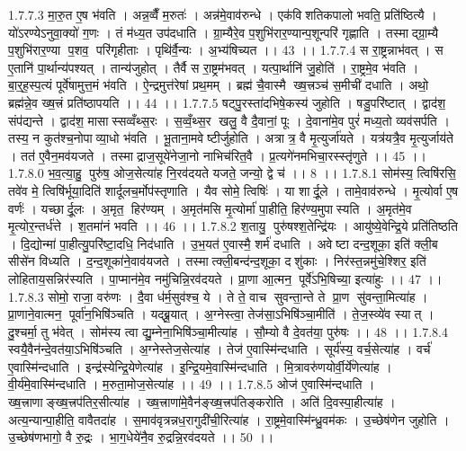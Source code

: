 1.7.7.3
मा॒रु॒त ए॒ष भ॑वति । अन्न॒व्वैँ म॒रुतः॑ । अन्न॑मे॒वाव॑रुन्धे । एक॑विशतिकपालो भवति॒ प्रति॑ष्ठित्यै । यो॑ऽरण्येऽनुवा॒क्यो॑ ग॒णः । तं म॑ध्य॒त उप॑दधाति । ग्रा॒म्यैरे॒व प॒शुभि॑रार॒ण्यान्प॒शून्परि॑ गृह्णाति । तस्माद्ग्रा॒म्यै प॒शुभि॑रार॒ण्या प॒शव॒ परि॑गृहीताः । पृथि॑र्वै॒न्यः । अ॒भ्य॑षिच्यत ।। 43 ।।
1.7.7.4
स रा॒ष्ट्रन्नाभ॑वत् । स ए॒तानि॑ पा॒र्थान्य॑पश्यत् । तान्य॑जुहोत् । तैर्वै स रा॒ष्ट्रम॑भवत् । यत्पा॒र्थानि॑ जु॒होति॑ । रा॒ष्ट्रमे॒व भ॑वति । बा॒र्॒ह॒स्प॒त्यं पूर्वे॑षामुत्त॒मं भ॑वति । ऐ॒न्द्रमुत्त॑रेषां प्रथ॒मम् । ब्रह्म॑ चै॒वास्मै ख्ष॒त्त्रञ्च॑ स॒मीची॑ दधाति । अथो॒ ब्रह्म॑न्ने॒व ख्ष॒त्त्रं प्रति॑ष्ठापयति ।। 44 ।।
1.7.7.5
षट्पु॒रस्ता॑दभिषे॒कस्य॑ जुहोति । षडु॒परि॑ष्टात् । द्वाद॑श॒ संप॑द्यन्ते । द्वाद॑श॒ मासास्सव्वँथ्स॒रः । स॒व्वँ॒थ्स॒र खलु॒ वै दै॒वानां॒ पूः । दे॒वाना॑मे॒व पुरं॑ मध्य॒तो व्यव॑सर्पति । तस्य॒ न कुत॑श्च॒नोपाव्या॒धो भ॑वति । भू॒ताना॒मवेष्टीर्जुहोति । अत्रात्र॒ वै मृ॒त्युर्जा॑यते । यत्र॑यत्रै॒व मृ॒त्युर्जाय॑ते । तत॑ ए॒वैन॒मव॑यजते । तस्माद्राज॒सूये॑नेजा॒नो नाभिच॑रित॒वै । प्र॒त्यगे॑नमभिचा॒रस्स्तृ॑णुते ।। 45 ।।
1.7.8.0
भ॒व॒त्या॒हु॒ पुरु॑ष॒ ओज॒सेत्या॑ह नि॒रव॑दयते यजते॒ जन्यो॒ द्वे च॑ ।। 8 ।।
1.7.8.1
सोम॑स्य॒ त्विषि॑रसि॒ तवे॑व मे॒ त्विषि॑र्भूया॒दिति॑ शार्दूलच॒र्मोप॑स्तृणाति । यैव सोमे॒ त्विषिः॑ । या शार्दू॒ले । तामे॒वाव॑रुन्धे । मृ॒त्योर्वा ए॒ष वर्णः॑ । यच्छार्दू॒लः । अ॒मृत॒॒ हिर॑ण्यम् । अ॒मृत॑मसि मृ॒त्योर्मा॑ पा॒हीति॒ हिर॑ण्य॒मुपास्यति । अ॒मृत॑मे॒व मृ॒त्योर॒न्तर्ध॑त्ते । श॒तमा॑नं भवति ।। 46 ।।
1.7.8.2
श॒तायु॒ पुरु॑षश्श॒तेन्द्रि॑यः । आयु॑ष्ये॒वेन्द्रि॒ये प्रति॑तिष्ठति । दि॒द्योन्मा॑ पा॒हीत्यु॒परि॑ष्टा॒दधि॒ निद॑धाति । उ॒भ॒यत॑ ए॒वास्मै॒ शर्म॑ दधाति । अवेष्टा दन्द॒शूका॒ इति॑ क्ली॒ब सीसे॑न विध्यति । द॒न्द॒शूका॑ने॒वाव॑यजते । तस्मात्क्ली॒बन्द॑न्द॒शूका॒ दशु॑काः । निर॑स्त॒न्नमु॑चे॒श्शिर॒ इति॑ लोहिताय॒सन्निर॑स्यति । पा॒प्मान॑मे॒व नमु॑चिन्नि॒रव॑दयते । प्रा॒णा आ॒त्मन॒ पूर्वे॑ऽभि॒षिच्या॒ इत्या॑हुः ।। 47 ।।
1.7.8.3
सोमो॒ राजा॒ वरु॑णः । दै॒वा ध॑र्म॒सुव॑श्च॒ ये । ते ते॒ वाच॑ सुवन्ता॒न्ते ते प्रा॒ण सु॑वन्ता॒मित्या॑ह । प्रा॒णाने॒वात्मन॒ पूर्वा॑न॒भिषि॑ञ्चति । यद्ब्रू॒यात् । अ॒ग्नेस्त्वा॒ तेज॑सा॒ऽभिषि॑ञ्चा॒मीति॑ । ते॒ज॒स्व्ये॑व स्यात् । दु॒श्चर्मा॒ तु भ॑वेत् । सोम॑स्य त्वा द्यु॒म्नेना॒भिषि॑ञ्चा॒मीत्या॑ह । सौ॒म्यो वै दे॒वत॑या॒ पुरु॑षः ।। 48 ।।
1.7.8.4
स्वयै॒वैन॑न्दे॒वत॑या॒ऽभिषि॑ञ्चति । अ॒ग्नेस्तेज॒सेत्या॑ह । तेज॑ ए॒वास्मि॑न्दधाति । सूर्य॑स्य॒ वर्च॒सेत्या॑ह । वर्च॑ ए॒वास्मि॑न्दधाति । इन्द्र॑स्येन्द्रि॒येणेत्या॑ह । इ॒न्द्रि॒यमे॒वास्मि॑न्दधाति । मि॒त्रावरु॑णयोर्वी॒र्ये॑णेत्या॑ह । वी॒र्य॑मे॒वास्मि॑न्दधाति । म॒रुता॒मोज॒सेत्या॑ह ।। 49 ।।
1.7.8.5
ओज॑ ए॒वास्मि॑न्दधाति । ख्ष॒त्त्राणाङ्ख्ष॒त्त्रप॑तिर॒सीत्या॑ह । ख्ष॒त्त्राणा॑मे॒वैन॑ङ्ख्ष॒त्त्रप॑तिङ्करोति । अति॑ दि॒वस्पा॒हीत्या॑ह । अत्य॒न्यान्पा॒हीति॒ वावैतदा॑ह । स॒माव॑वृत्रन्नध॒रागुदी॑ची॒रित्या॑ह । रा॒ष्ट्रमे॒वास्मि॑न्ध्रु॒वम॑कः । उ॒च्छेष॑णेन जुहोति । उ॒च्छेष॑णभागो॒ वै रु॒द्रः । भा॒ग॒धेये॑नै॒व रु॒द्रन्नि॒रव॑दयते ।। 50 ।।
